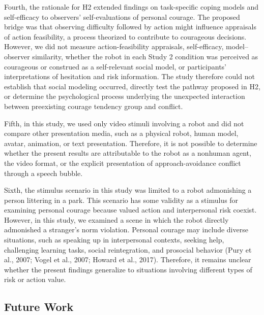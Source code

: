 Fourth, the rationale for H2 extended findings on task-specific coping
models and self-efficacy to observers' self-evaluations of personal
courage. The proposed bridge was that observing difficulty followed by
action might influence appraisals of action feasibility, a process
theorized to contribute to courageous decisions. However, we did not
measure action-feasibility appraisals, self-efficacy, model--observer
similarity, whether the robot in each Study 2 condition was perceived as
courageous or construed as a self-relevant social model, or
participants' interpretations of hesitation and risk information. The
study therefore could not establish that social modeling occurred,
directly test the pathway proposed in H2, or determine the psychological
process underlying the unexpected interaction between preexisting
courage tendency group and conflict.

Fifth, in this study, we used only video stimuli involving a robot and
did not compare other presentation media, such as a physical robot,
human model, avatar, animation, or text presentation. Therefore, it is
not possible to determine whether the present results are attributable
to the robot as a nonhuman agent, the video format, or the explicit
presentation of approach-avoidance conflict through a speech bubble.

Sixth, the stimulus scenario in this study was limited to a robot
admonishing a person littering in a park. This scenario has some
validity as a stimulus for examining personal courage because valued
action and interpersonal risk coexist. However, in this study, we
examined a scene in which the robot directly admonished a stranger's
norm violation. Personal courage may include diverse situations, such as
speaking up in interpersonal contexts, seeking help, challenging
learning tasks, social reintegration, and prosocial behavior (Pury et
al., 2007; Vogel et al., 2007; Howard et al., 2017). Therefore, it
remains unclear whether the present findings generalize to situations
involving different types of risk or action value.

\subsection{Future Work}\label{future-work}

